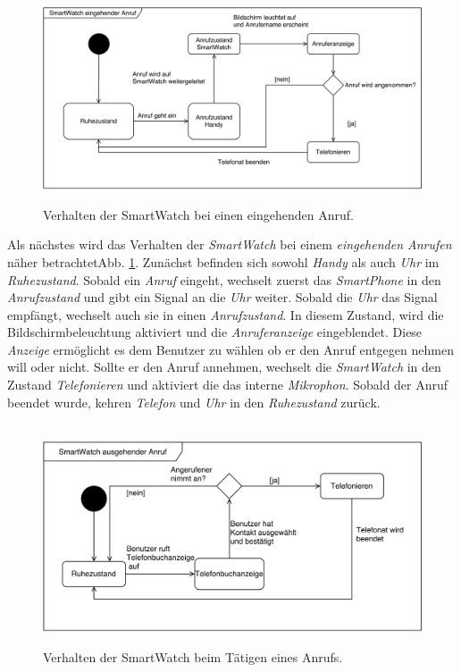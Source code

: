 \begin{figure}[h]
\centering\
\includegraphics[width=\textwidth]{img/stateAnrufEingehend}
\caption[State Diagram: eingehender Anruf]{Verhalten der SmartWatch bei einen eingehenden Anruf.}
\label{fig:stateAnrufEingehend}
\end{figure}
Als nächstes wird das Verhalten der \textit{SmartWatch} bei einem \textit{eingehenden Anrufen} näher betrachtetAbb. \ref{fig:stateAnrufEingehend}. Zunächst befinden sich sowohl \textit{Handy} als auch \textit{Uhr} im \textit{Ruhezustand}. Sobald ein \textit{Anruf} eingeht, wechselt zuerst das \textit{SmartPhone} in den \textit{Anrufzustand} und gibt ein Signal an die \textit{Uhr} weiter. Sobald die \textit{Uhr} das Signal empfängt, wechselt auch sie in einen \textit{Anrufzustand}. In diesem Zustand, wird die Bildschirmbeleuchtung aktiviert und die \textit{Anruferanzeige} eingeblendet. Diese \textit{Anzeige} ermöglicht es dem Benutzer zu wählen ob er den Anruf entgegen nehmen will oder nicht. Sollte er den Anruf annehmen, wechselt die \textit{SmartWatch} in den Zustand \textit{Telefonieren} und aktiviert die das interne \textit{Mikrophon}. Sobald der Anruf beendet wurde, kehren \textit{Telefon} und \textit{Uhr} in den \textit{Ruhezustand} zurück. \\
\begin{figure}[h]
\centering\
\includegraphics[width=\textwidth]{img/stateAnrufAusgehend}
\caption[State Diagram: ausgehender Anruf]{Verhalten der SmartWatch beim Tätigen eines Anrufs.}
\label{fig:stateAnrufAusgehend}
\end{figure}
